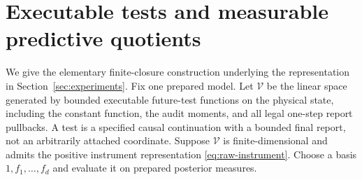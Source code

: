 \section{Executable tests and measurable predictive quotients}\label{app:quotient}
We give the elementary finite-closure construction underlying the representation in Section~\ref{sec:experiments}. Fix one prepared model. Let $\mathcal V$ be the linear space generated by bounded executable future-test functions on the physical state, including the constant function, the audit moments, and all legal one-step report pullbacks. A test is a specified causal continuation with a bounded final report, not an arbitrarily attached coordinate. Suppose $\mathcal V$ is finite-dimensional and admits the positive instrument representation \eqref{eq:raw-instrument}. Choose a basis $1,f_1,\ldots,f_d$ and evaluate it on prepared posterior measures.

